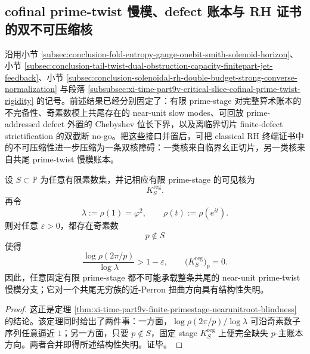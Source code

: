 \subsection{cofinal prime-twist 慢模、defect 账本与 RH 证书的双不可压缩核}\label{subsec:conclusion-primestage-slowmode-rh-dual-nogo}

沿用小节 \ref{subsec:conclusion-fold-entropy-gauge-onebit-smith-solenoid-horizon}、小节 \ref{subsec:conclusion-tail-twist-dual-obstruction-capacity-finitepart-jet-feedback}、小节 \ref{subsec:conclusion-solenoidal-rh-double-budget-strong-converse-normalization} 与段落 \ref{subsubsec:xi-time-part9v-critical-slice-cofinal-prime-twist-rigidity} 的记号。前述结果已经分别固定了：有限 prime-stage 对完整算术账本的不完备性、奇素数模上共尾存在的 near-unit slow modes、可回放 prime-addressed defect 外置的 Chebyshev 位长下界，以及离临界切片 finite-defect strictification 的双截断 no-go。把这些接口并置后，可把 classical RH 终端证书中的不可压缩性进一步压缩为一条双核障碍：一类核来自临界幺正切片，另一类核来自共尾 prime-twist 慢模账本。

\begin{theorem}\label{thm:conclusion-finite-primestage-cofinal-slowmode-blindness}
设 \(S\subset\mathbb P\) 为任意有限素数集，并记相应有限 prime-stage 的可见核为
\[
K_S^{\mathrm{reg}}.
\]
再令
\[
\lambda:=\rho(1)=\varphi^2,
\qquad
\rho(t):=\rho(e^{it}).
\]
则对任意 \(\varepsilon>0\)，都存在奇素数
\[
p\notin S
\]
使得
\[
\frac{\log \rho(2\pi/p)}{\log \lambda}>1-\varepsilon,
\qquad
\bigl(K_S^{\mathrm{reg}}\bigr)_p=0.
\]
因此，任意固定有限 prime-stage 都不可能承载整条共尾的 near-unit prime-twist 慢模分支；它对一个共尾无穷族的近-Perron 扭曲方向具有结构性失明。
\end{theorem}
\begin{proof}
这正是定理 \ref{thm:xi-time-part9v-finite-primestage-nearunitroot-blindness} 的结论。该定理同时给出了两件事：一方面，\(\log\rho(2\pi/p)/\log\lambda\) 可沿奇素数子序列任意逼近 \(1\)；另一方面，只要 \(p\notin S\)，固定 stage \(K_S^{\mathrm{reg}}\) 上便完全缺失 \(p\)-主账本方向。两者合并即得所述结构性失明。证毕。
\end{proof}

